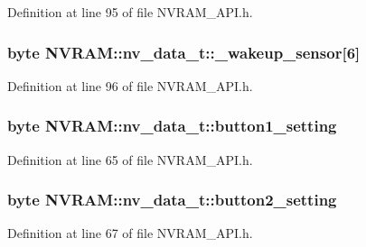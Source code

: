 Definition at line 95 of file N\-V\-R\-A\-M\-\_\-\-A\-P\-I.\-h.

\hypertarget{struct_n_v_r_a_m_1_1nv__data__t_a06f2246fa486db15716cf92d407c870f}{
\subsubsection[{\-\_\-wakeup\-\_\-sensor}]{\setlength{\rightskip}{0pt plus 5cm}byte N\-V\-R\-A\-M\-::nv\-\_\-data\-\_\-t\-::\-\_\-wakeup\-\_\-sensor\mbox{[}6\mbox{]}}}\label{struct_n_v_r_a_m_1_1nv__data__t_a06f2246fa486db15716cf92d407c870f}


Definition at line 96 of file N\-V\-R\-A\-M\-\_\-\-A\-P\-I.\-h.

\hypertarget{struct_n_v_r_a_m_1_1nv__data__t_a19c7c0d63ef3f54f87ef7c3bafe36fdf}{
\subsubsection[{button1\-\_\-setting}]{\setlength{\rightskip}{0pt plus 5cm}byte N\-V\-R\-A\-M\-::nv\-\_\-data\-\_\-t\-::button1\-\_\-setting}}\label{struct_n_v_r_a_m_1_1nv__data__t_a19c7c0d63ef3f54f87ef7c3bafe36fdf}


Definition at line 65 of file N\-V\-R\-A\-M\-\_\-\-A\-P\-I.\-h.

\hypertarget{struct_n_v_r_a_m_1_1nv__data__t_aec88de9d995c7a44eb4f79565c93a6be}{
\subsubsection[{button2\-\_\-setting}]{\setlength{\rightskip}{0pt plus 5cm}byte N\-V\-R\-A\-M\-::nv\-\_\-data\-\_\-t\-::button2\-\_\-setting}}\label{struct_n_v_r_a_m_1_1nv__data__t_aec88de9d995c7a44eb4f79565c93a6be}


Definition at line 67 of file N\-V\-R\-A\-M\-\_\-\-A\-P\-I.\-h.

